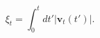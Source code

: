 \begin{equation}
\xi_t = \int_{0}^{t}{\mathit{dt'}|\mathbf{v}_t(\mathit{t'})|} .
 \label{eq:xit}
\end{equation}
